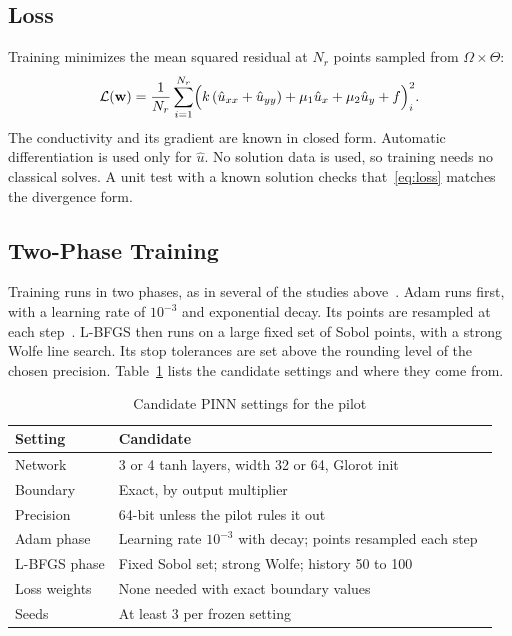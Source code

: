 \documentclass[journal]{IEEEtran}
\begin{document}
\subsection{Loss}
Training minimizes the mean squared residual at $N_r$ points sampled from $\Omega\times\Theta$:
\begin{equation}
\mathcal L(\mathbf{w})=\frac1{N_r}\sum_{i=1}^{N_r}\Bigl(k\,(\hat u_{xx}+\hat u_{yy})+\mu_1\hat u_x+\mu_2\hat u_y+f\Bigr)^2_{i}.
\label{eq:loss}
\end{equation}
The conductivity and its gradient are known in closed form. Automatic differentiation is used only for $\hat u$. No solution data is used, so training needs no classical solves. A unit test with a known solution checks that~\eqref{eq:loss} matches the divergence form.

\subsection{Two-Phase Training}
Training runs in two phases, as in several of the studies above~\cite{rathore2024,grossmann2024,markidis2021}. Adam runs first, with a learning rate of $10^{-3}$ and exponential decay. Its points are resampled at each step~\cite{wu2023}. L-BFGS then runs on a large fixed set of Sobol points, with a strong Wolfe line search. Its stop tolerances are set above the rounding level of the chosen precision. Table~\ref{tab:settings} lists the candidate settings and where they come from.

\begin{table}[t]
\caption{Candidate PINN settings for the pilot}
\label{tab:settings}
\centering
\footnotesize
\setlength{\tabcolsep}{3pt}
\begin{tabular}{@{}lp{5.6cm}@{}}
\toprule
Setting & Candidate \\
\midrule
Network & 3 or 4 tanh layers, width 32 or 64, Glorot init~\cite{urban2025,sun2020} \\
Boundary & Exact, by output multiplier~\cite{sukumar2022} \\
Precision & 64-bit unless the pilot rules it out~\cite{xu2025} \\
Adam phase & Learning rate $10^{-3}$ with decay; points resampled each step~\cite{hao2024,wu2023} \\
L-BFGS phase & Fixed Sobol set; strong Wolfe; history 50 to 100~\cite{rathore2024} \\
Loss weights & None needed with exact boundary values~\cite{wang2021gradient} \\
Seeds & At least 3 per frozen setting \\
\bottomrule
\end{tabular}
\end{table}
\end{document}
